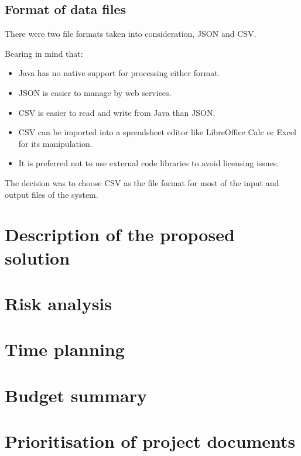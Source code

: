 \subsection{Format of data files}

There were two file formats taken into consideration, JSON and CSV.

Bearing in mind that:

\begin{itemize}
    \item Java has no native support for processing either format.
    \item JSON is easier to manage by web services.
    \item CSV is easier to read and write from Java than JSON.
    \item CSV can be imported into a spreadsheet editor like LibreOffice Calc or Excel for its manipulation.
    \item It is preferred not to use external code libraries to avoid licensing issues.
\end{itemize}

The decision was to choose CSV as the file format for most of the input and output files of the system.

\section{Description of the proposed solution}
\section{Risk analysis}
\section{Time planning}
\section{Budget summary}
\section{Prioritisation of project documents}

